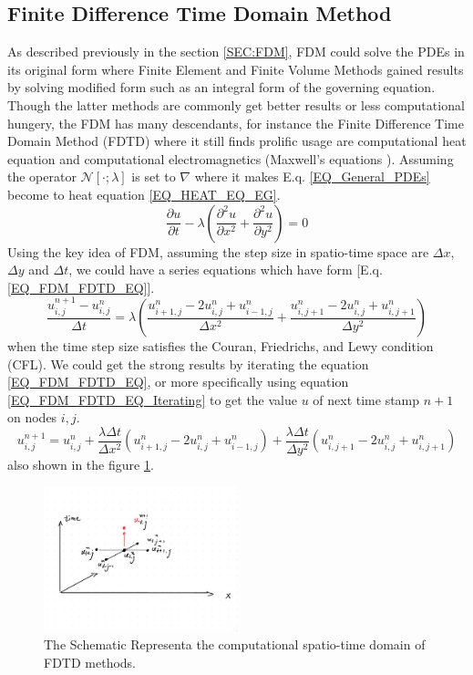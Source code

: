 \subsection{Finite Difference Time Domain Method}
As described previously in the 
section \ref{SEC:FDM}, FDM could solve the PDEs in its original form where 
Finite Element and Finite Volume Methods gained results by solving modified form such as an integral form of the governing equation.
Though the latter methods are commonly get better results or less computational hungery, 
the FDM has many descendants, 
for instance the Finite Difference Time Domain Method (FDTD) where it still finds prolific usage are computational heat equation and 
computational electromagnetics (Maxwell's equations \cite{Maxwell_equations}). 
Assuming the operator $\mathcal{N}[\cdot;\lambda]$ is set to $\nabla$ where it makes E.q. \ref{EQ_General_PDEs} become 
to heat equation \ref{EQ_HEAT_EQ_EG}.
\begin{equation}\label{EQ_HEAT_EQ_EG}
  \frac{\partial u}{\partial t} 
  - \lambda \left(
    \frac{\partial^2 u}{\partial x^2}  + \frac{\partial^2 u}{\partial y^2} 
  \right) = 0
\end{equation}
Using the key idea of FDM, assuming the step size in spatio-time space are $\Delta x$, $\Delta y$ and $\Delta t$,
we could have a series equations which have form [E.q. \ref{EQ_FDM_FDTD_EQ}].
\begin{equation}\label{EQ_FDM_FDTD_EQ}
  \frac{u^{n+1}_{i,j} - u^n_{i,j}}{\Delta t} 
  = 
  \lambda
  \left(
    \frac{
      u^n_{i+1,j} - 2u^n_{i,j} + u^n_{i-1,j}
    }{\Delta x^2}
    +
    \frac{
      u^n_{i,j+1} - 2u^n_{i,j} + u^n_{i,j+1}
    }{\Delta y^2}
  \right)
\end{equation}
when the time step size satisfies the 
Couran, Friedrichs, and Lewy condition (CFL\cite{CFL_limitation}).
We could get the strong results by iterating the equation \ref{EQ_FDM_FDTD_EQ}, or more specifically using 
equation \ref{EQ_FDM_FDTD_EQ_Iterating} to get the value $u$ of next time stamp $n+1$ on nodes $i,j$.
\begin{equation}\label{EQ_FDM_FDTD_EQ_Iterating}
  u^{n+1}_{i,j}
  = 
  u^n_{i,j} + 
    \frac{
      \lambda\Delta t
    }{\Delta x^2}\left(
      u^n_{i+1,j} - 2u^n_{i,j} + u^n_{i-1,j}
    \right)
    +
    \frac{
      \lambda\Delta t
    }{\Delta y^2}\left(
      u^n_{i,j+1} - 2u^n_{i,j} + u^n_{i,j+1}
    \right)
\end{equation}
also shown in the figure \ref{FIG_Schematic_View_FDTD}.
\begin{figure}[htbp]
  \centering
  \includegraphics[width=0.5\textwidth]{figure/FIG_Schematic_View_FDTD.jpg}
  \caption{The Schematic Representa the computational spatio-time domain of FDTD methods.}
  \label{FIG_Schematic_View_FDTD}
\end{figure}


